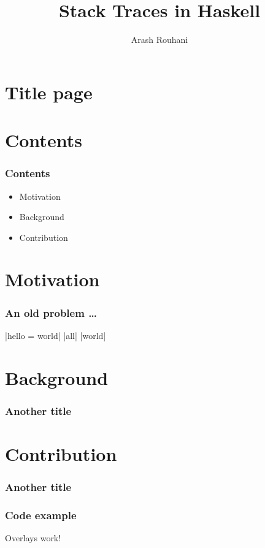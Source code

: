 \documentclass[11pt]{beamer} %
\title{Stack Traces in Haskell}
\author[Arash Rouhani]{Arash Rouhani} %
\institute{Chalmers University of Technology}
\begin{document}



\section{Title page} %
\begin{frame}[plain]
 \titlepage
\end{frame}

\section{Contents}
\begin{frame}
 \frametitle{Contents}
\begin{itemize}
 \item Motivation
 \item Background
 \item Contribution
\end{itemize}
\end{frame}

\section{Motivation}
\begin{frame}
 \frametitle{An old problem \dots}
  |hello = world|
  |all|
  |world|
\end{frame}

\section{Background}
\begin{frame}
 \frametitle{Another title}
\end{frame}

\section{Contribution}
\begin{frame}
 \frametitle{Another title}
\end{frame}

\begin{frame}
\frametitle{Code example}
\exampleCode
\pause
Overlays work!
\end{frame}
\end{document}
